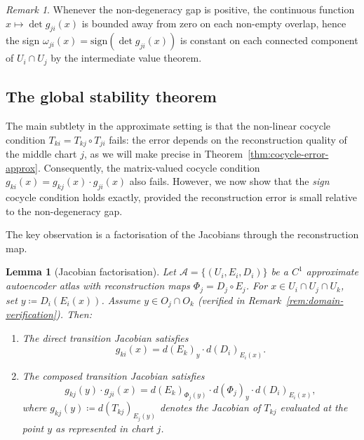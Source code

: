 \documentclass[11pt]{article}
\theoremstyle{plain}
\newtheorem{lemma}[theorem]{Lemma}
\theoremstyle{definition}
\theoremstyle{remark}
\newtheorem{remark}[theorem]{Remark}
\begin{document}
\begin{remark}\label{rem:sign-constancy}
Whenever the non-degeneracy gap is positive, the continuous function $x \mapsto \det g_{ji}(x)$ is bounded away from zero on each non-empty overlap, hence the sign $\omega_{ji}(x) = \mathrm{sign}(\det g_{ji}(x))$ is constant on each connected component of $U_i \cap U_j$ by the intermediate value theorem.
\end{remark}

\subsection{The global stability theorem}

The main subtlety in the approximate setting is that the non-linear cocycle condition $T_{ki} = T_{kj} \circ T_{ji}$ fails: the error depends on the reconstruction quality of the middle chart $j$, as we will make precise in Theorem~\ref{thm:cocycle-error-approx}. Consequently, the matrix-valued cocycle condition $g_{ki}(x) = g_{kj}(x) \cdot g_{ji}(x)$ also fails. However, we now show that the \emph{sign} cocycle condition holds exactly, provided the reconstruction error is small relative to the non-degeneracy gap.

The key observation is a factorisation of the Jacobians through the reconstruction map.

\begin{lemma}[Jacobian factorisation]\label{lemma:jacobian-factorisation}
Let $\mathcal{A} = \{(U_i, E_i, D_i)\}$ be a $C^1$ approximate autoencoder atlas with reconstruction maps $\Phi_j = D_j \circ E_j$. For $x \in U_i \cap U_j \cap U_k$, set $y \coloneqq D_i(E_i(x))$. Assume $y \in O_j \cap O_k$ (verified in Remark~\ref{rem:domain-verification}). Then:
\begin{enumerate}
    \item The direct transition Jacobian satisfies
    \[
    g_{ki}(x) = d(E_k)_y \cdot d(D_i)_{E_i(x)}.
    \]
    \item The composed transition Jacobian satisfies
    \[
    g_{kj}(y) \cdot g_{ji}(x) = d(E_k)_{\Phi_j(y)} \cdot d(\Phi_j)_y \cdot d(D_i)_{E_i(x)},
    \]
    where $g_{kj}(y) \coloneqq d(T_{kj})_{E_j(y)}$ denotes the Jacobian of $T_{kj}$ evaluated at the point $y$ as represented in chart $j$.
\end{enumerate}
\end{lemma}
\end{document}
